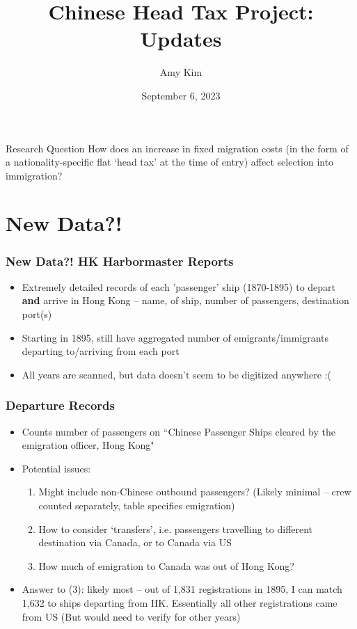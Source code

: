 \documentclass[pdf]{beamer}
\title{Chinese Head Tax Project: Updates}
\author{Amy Kim}
\date{September 6, 2023}
\begin{document}
\begin{frame}[plain]
    \titlepage
\end{frame}

\begin{frame}{Research Question}
    How does an increase in fixed migration costs (in the form of a nationality-specific flat `head tax' at the time of entry) affect selection into immigration?
\end{frame}
\section{New Data?!}
\begin{frame}
    \frametitle{New Data?! HK Harbormaster Reports}
    \begin{itemize}
        \item Extremely detailed records of each 'passenger' ship (1870-1895) to depart \textbf{and} arrive in Hong Kong -- name, of ship, number of passengers, destination port(s) 
        \item Starting in 1895, still have aggregated number of emigrants/immigrants departing to/arriving from each port 
        \item All years are scanned, but data doesn't seem to be digitized anywhere :( 
    \end{itemize}
\end{frame}

\begin{frame}[label = departure]
    \frametitle{Departure Records}
    \begin{itemize}
        \item Counts number of passengers on ``Chinese Passenger Ships cleared by the emigration officer, Hong Kong" \hyperlink{hk_departure}{}
        \item Potential issues: 
        \begin{enumerate}
            \item Might include non-Chinese outbound passengers? (Likely minimal -- crew counted separately, table specifies emigration)
            \item How to consider `transfers', i.e. passengers travelling to different destination via Canada, or to Canada via US
            \item How much of emigration to Canada was out of Hong Kong?
        \end{enumerate}
        \item Answer to (3): likely most -- out of 1,831 registrations in 1895, I can match 1,632 to ships departing from HK. Essentially all other registrations came from US \hyperlink{reg_summ}{} (But would need to verify for other years)
    \end{itemize}
\end{frame}
\end{document}
